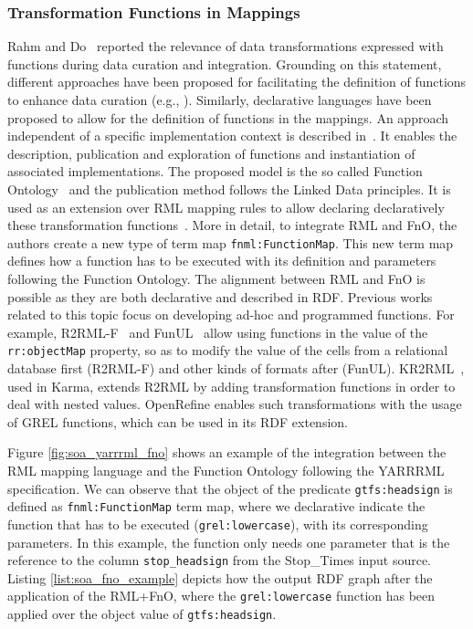 \subsubsection{Transformation Functions in Mappings}
Rahm and Do~\citep{rahm2000data} reported the relevance of data transformations expressed with functions during data curation and integration. Grounding on this statement, different approaches have been proposed for facilitating the definition of functions to enhance data curation (e.g., \citep{galhardas2001declarative,GuptaSKGTM12,raman2001potter}). Similarly, declarative languages have been proposed to allow for the definition of functions in the mappings. An approach independent of a specific implementation context is described in~\citep{demeester2019implementation}. It enables the description, publication and exploration of functions and instantiation of associated implementations. The proposed model is the so called Function Ontology~\citep{de2016ontology} and the publication method follows the Linked Data principles. It is used as an extension over RML mapping rules to allow declaring declaratively these transformation functions~\citep{de2017declarative}. More in detail, to integrate RML and FnO, the authors create a new type of term map \texttt{fnml:FunctionMap}. This new term map defines how a function has to be executed with its definition and parameters following the Function Ontology. The alignment between RML and FnO is possible as they are both declarative and described in RDF. Previous works related to this topic focus on developing ad-hoc and programmed functions. For example, R2RML-F~\citep{debruyne2016r2rml} and FunUL~\citep{junior2016funul,junior2016incorporating} allow using functions in the value of the \texttt{rr:objectMap} property, so as to modify the value of the cells from a relational database first (R2RML-F) and other kinds of formats after (FunUL). KR2RML~\citep{slepicka2015kr2rml}, used in Karma, extends R2RML by adding transformation functions in order to deal with nested values. OpenRefine enables such transformations with the usage of GREL functions, which can be used in its RDF extension. 


Figure \ref{fig:soa_yarrrml_fno} shows an example of the integration between the RML mapping language and the Function Ontology following the YARRRML specification. We can observe that the object of the predicate \texttt{gtfs:headsign} is defined as \texttt{fnml:FunctionMap} term map, where we declarative indicate the function that has to be executed (\texttt{grel:lowercase}), with its corresponding parameters. In this example, the function only needs one parameter that is the reference to the column \texttt{stop\_headsign} from the Stop\_Times input source. Listing \ref{list:soa_fno_example} depicts how the output RDF graph after the application of the RML+FnO, where the \texttt{grel:lowercase} function has been applied over the object value of \texttt{gtfs:headsign}.

